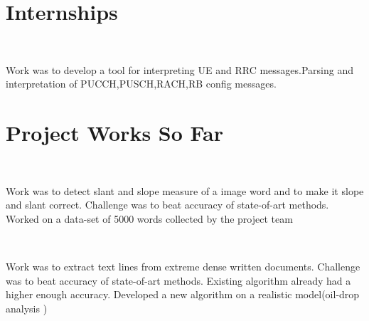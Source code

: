\documentclass[]{deedy-resume-openfont}
\begin{document}
\hfill
\begin{minipage}[t]{0.65\textwidth} 


\section{Internships}
\\
\vspace{\topsep} %
\begin{tightemize}
\item Work was to develop a tool for interpreting UE and RRC messages.Parsing and interpretation of PUCCH,PUSCH,RACH,RB config messages. 
\end{tightemize}
\sectionsep
\sectionsep

\section{Project Works So Far}
\\
\vspace{\topsep} %
\begin{tightemize}
\item Work was to detect slant and slope measure of a image word and to make it slope and slant correct. Challenge was to beat accuracy of state-of-art methods. Worked on a data-set of 5000 words collected by the project team
\end{tightemize}
\sectionsep

\\
\vspace{\topsep} %
\begin{tightemize}
\item Work was to extract text lines from extreme dense written documents. Challenge was to beat accuracy of state-of-art methods. Existing algorithm already had a higher enough accuracy. Developed a new algorithm on a realistic model(oil-drop analysis ) 
\end{tightemize}
\sectionsep
\sectionsep


\end{minipage}
\end{document}
